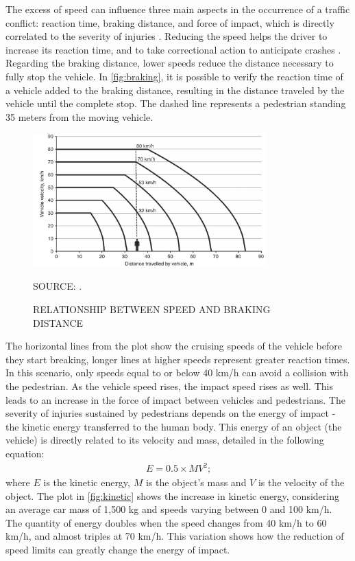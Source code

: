 The excess of speed can influence three main aspects in the occurrence of a traffic conflict: reaction time, braking distance, and force of impact, which is directly correlated to the severity of injuries \cite{Mohan2016a}. Reducing the speed helps the driver to increase its reaction time, and to take correctional action to anticipate crashes \cite{Elvik2009}. Regarding the braking distance, lower speeds reduce the distance necessary to fully stop the vehicle. In \autoref{fig:braking}, it is possible to verify the reaction time of a vehicle added to the braking distance, resulting in the distance traveled by the vehicle until the complete stop. The dashed line represents a pedestrian standing 35 meters from the moving vehicle. 

\begin{figure}[!htbp]
    \centering\footnotesize
    \captionsetup{font=footnotesize}
    \caption{RELATIONSHIP BETWEEN SPEED AND BRAKING DISTANCE}
    \includegraphics[width=0.8\textwidth]{fig/braking2.png}
    \label{fig:braking}
    \par SOURCE: \textcite{Mohan2016a}.
\end{figure} 

The horizontal lines from the plot show the cruising speeds of the vehicle before they start breaking, longer lines at higher speeds represent greater reaction times. In this scenario, only speeds equal to or below 40 km/h can avoid a collision with the pedestrian. As the vehicle speed rises, the impact speed rises as well. This leads to  an increase in the force of impact between vehicles and pedestrians. The severity of injuries sustained by pedestrians depends on the energy of impact - the kinetic energy transferred to the human body. This energy of an object (the vehicle) is directly related to its velocity and mass, detailed in the following equation: \begin{align}
    E = 0.5 \times MV^2 \mbox{;}
    \label{eq:energy}
\end{align} where $E$ is the kinetic energy, $M$ is the object's mass and $V$ is the velocity of the object. The plot in \autoref{fig:kinetic} shows the increase in kinetic energy, considering an average car mass of 1,500 kg \cite{Zervas2008} and speeds varying between 0 and 100 km/h. The quantity of energy doubles when the speed changes from 40 km/h to 60 km/h, and almost triples at 70 km/h. This variation shows how the reduction of speed limits can greatly change the energy of impact.

